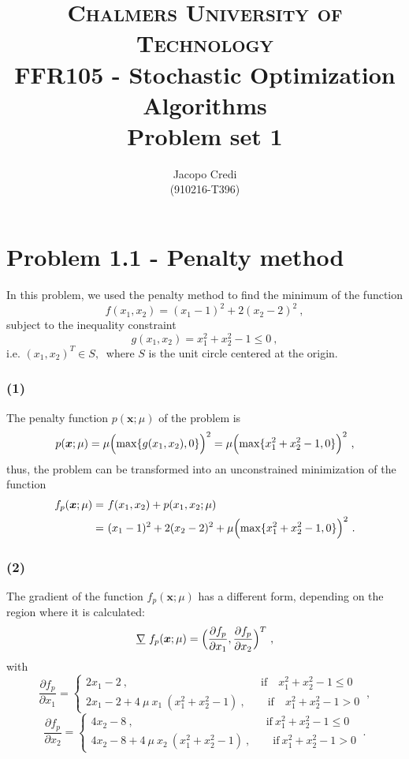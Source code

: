 \documentclass[12pt,titlepage]{article}
\author{Jacopo Credi \\(910216-T396) \\ \vspace*{2cm} }
\title{{\Large \textsc{Chalmers University of Technology}} \\ \bigskip FFR105 - Stochastic Optimization Algorithms\\ \bigskip Problem set 1 \\ \vspace*{2cm}}
\begin{document}
\parindent=0cm
\maketitle

\clearpage\mbox{} \thispagestyle{empty} \clearpage

\section*{Problem 1.1 - Penalty method}
\setcounter{page}{1}
In this problem, we used the penalty method to find the minimum of the function
\begin{equation}
f(x_1,x_2) = (x_1 - 1)^2 + 2(x_2 - 2)^2 \ ,
\end{equation}
subject to the inequality constraint
\begin{equation}
g(x_1,x_2) = x_1^2 + x_2^2 - 1 \leq 0 \ ,
\end{equation}
i.e. $(x_1, x_2)^T \in S, \ $ where $S$ is the unit circle centered at the origin. 

\subsubsection*{(1)}
The penalty function $p(\bm{x} ; \mu)$ of the problem is
\begin{equation}
p(\bm{x} ; \mu) = \mu \Bigl( \max \lbrace g(x_1, x_2), 0 \rbrace \Bigr)^2 = \mu \Bigl( \max \lbrace x_1^2 + x_2^2 - 1, 0 \rbrace \Bigr)^2 \ ,
\end{equation}
thus, the problem can be transformed into an unconstrained minimization of the function
\begin{align}
f_p(\bm{x} ; \mu) =& \ f(x_1,x_2) + p(x_1, x_2 ; \mu) \nonumber \\
=& \ (x_1 - 1)^2 + 2(x_2 - 2)^2 + \mu \Bigl( \max \lbrace x_1^2 + x_2^2 - 1, 0 \rbrace \Bigr)^2 \ .
\end{align}

\subsubsection*{(2)}
The gradient of the function $f_p(\bm{x} ; \mu)$ has a different form, depending on the region where it is calculated:
\[
\underline{\nabla} \ f_p(\bm{x} ; \mu) = \Bigl( \dfrac{\partial f_p}{\partial x_1} , \dfrac{\partial f_p}{\partial x_2} \Bigr)^T \ ,
\]
with
\[
\dfrac{\partial f_p}{\partial x_1} = \begin{cases}
2x_1 - 2 \ , \qquad \qquad  \qquad  \qquad \qquad  \qquad   \text{if} \quad x_1^2 + x_2^2 - 1 \leq 0 \\
2x_1 - 2 + 4\ \mu \ x_1 \ (x_1^2 + x_2^2 - 1) \ , \qquad \text{if} \quad x_1^2 + x_2^2 - 1 > 0 
\end{cases} \ ,
\]
\[
\dfrac{\partial f_p}{\partial x_2} = \begin{cases}
4x_2 -8 \ , \qquad \qquad  \qquad  \qquad \qquad  \qquad   \text{if} \ x_1^2 + x_2^2 - 1 \leq 0 \\
4x_2 -8 +4 \ \mu \ x_2 \ (x_1^2 + x_2^2 - 1) \ , \qquad \text{if} \ x_1^2 + x_2^2 - 1 > 0 
\end{cases} \ .
\]
 
\end{document}
